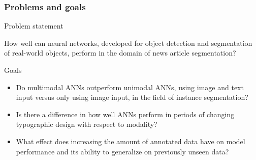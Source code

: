 \documentclass[aspectratio=1610]{beamer}
\begin{document}



\begin{frame}
  \frametitle{Problems and goals}

  \begin{Large}
    Problem statement
  \end{Large}

  \begin{small}
  How well can neural networks, developed for object detection and
segmentation of real-world objects, perform in the domain of news article
segmentation?
  \break
  \end{small}

  \begin{Large}
    Goals 
  \end{Large}


  \begin{small}
    \begin{itemize}
\item Do multimodal ANNs outperform unimodal ANNs, using image and text input versus only using image input, in the field of instance segmentation?
\item Is there a difference in how well ANNs perform in periods of changing typographic design with respect to modality?
\item What effect does increasing the amount of annotated data have on model performance and its ability to generalize on previously unseen data?
    \end{itemize}
  \end{small}

\end{frame}
\normalpage
\end{document}
